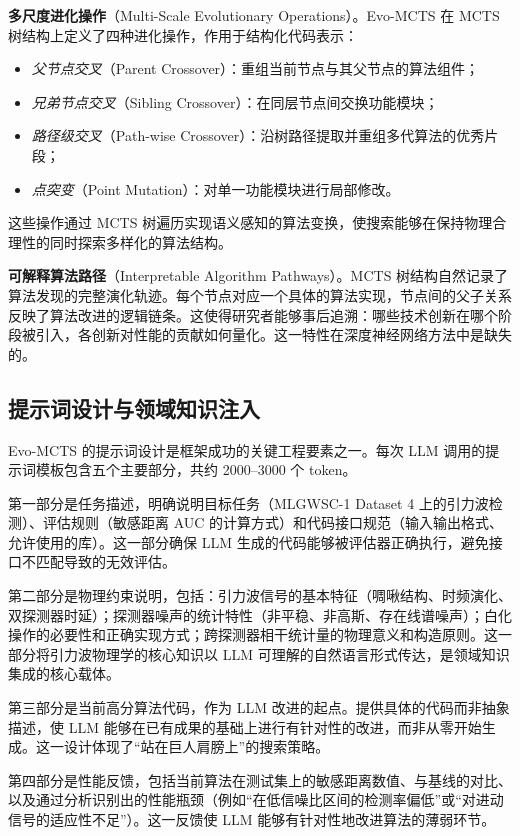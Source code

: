 \textbf{多尺度进化操作}（Multi-Scale Evolutionary Operations）。Evo-MCTS 在 MCTS 树结构上定义了四种进化操作，作用于结构化代码表示：
\begin{itemize}
  \item \textit{父节点交叉}（Parent Crossover）：重组当前节点与其父节点的算法组件；
  \item \textit{兄弟节点交叉}（Sibling Crossover）：在同层节点间交换功能模块；
  \item \textit{路径级交叉}（Path-wise Crossover）：沿树路径提取并重组多代算法的优秀片段；
  \item \textit{点突变}（Point Mutation）：对单一功能模块进行局部修改。
\end{itemize}
这些操作通过 MCTS 树遍历实现语义感知的算法变换，使搜索能够在保持物理合理性的同时探索多样化的算法结构。

\textbf{可解释算法路径}（Interpretable Algorithm Pathways）。MCTS 树结构自然记录了算法发现的完整演化轨迹。每个节点对应一个具体的算法实现，节点间的父子关系反映了算法改进的逻辑链条。这使得研究者能够事后追溯：哪些技术创新在哪个阶段被引入，各创新对性能的贡献如何量化。这一特性在深度神经网络方法中是缺失的。

\subsection{提示词设计与领域知识注入}

Evo-MCTS 的提示词设计是框架成功的关键工程要素之一。每次 LLM 调用的提示词模板包含五个主要部分，共约 2000--3000 个 token。

第一部分是任务描述，明确说明目标任务（MLGWSC-1 Dataset 4 上的引力波检测）、评估规则（敏感距离 AUC 的计算方式）和代码接口规范（输入输出格式、允许使用的库）。这一部分确保 LLM 生成的代码能够被评估器正确执行，避免接口不匹配导致的无效评估。

第二部分是物理约束说明，包括：引力波信号的基本特征（啁啾结构、时频演化、双探测器时延）；探测器噪声的统计特性（非平稳、非高斯、存在线谱噪声）；白化操作的必要性和正确实现方式；跨探测器相干统计量的物理意义和构造原则。这一部分将引力波物理学的核心知识以 LLM 可理解的自然语言形式传达，是领域知识集成的核心载体。

第三部分是当前高分算法代码，作为 LLM 改进的起点。提供具体的代码而非抽象描述，使 LLM 能够在已有成果的基础上进行有针对性的改进，而非从零开始生成。这一设计体现了“站在巨人肩膀上”的搜索策略。

第四部分是性能反馈，包括当前算法在测试集上的敏感距离数值、与基线的对比、以及通过分析识别出的性能瓶颈（例如“在低信噪比区间的检测率偏低”或“对进动信号的适应性不足”）。这一反馈使 LLM 能够有针对性地改进算法的薄弱环节。


